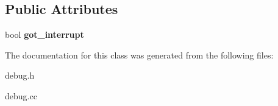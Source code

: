 \subsection*{Public Attributes}
\begin{DoxyCompactItemize}
\item 
\hypertarget{classDebug_a5c614ecbc3f6d1d782fc531b8fba6be0}{
bool {\bfseries got\_\-interrupt}}
\label{classDebug_a5c614ecbc3f6d1d782fc531b8fba6be0}

\end{DoxyCompactItemize}


The documentation for this class was generated from the following files:\begin{DoxyCompactItemize}
\item 
debug.h\item 
debug.cc\end{DoxyCompactItemize}
